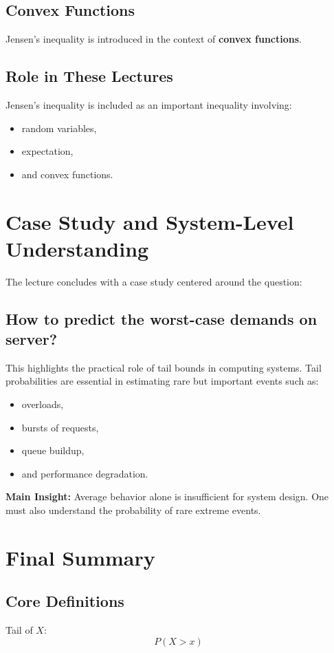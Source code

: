 \documentclass[12pt]{article}
\begin{document}
\subsection{Convex Functions}
Jensen’s inequality is introduced in the context of \textbf{convex functions}.

\subsection{Role in These Lectures}
Jensen’s inequality is included as an important inequality involving:
\begin{itemize}[leftmargin=1.5em]
    \item random variables,
    \item expectation,
    \item and convex functions.
\end{itemize}

\section{Case Study and System-Level Understanding}

The lecture concludes with a case study centered around the question:

\subsection*{How to predict the worst-case demands on server?}

This highlights the practical role of tail bounds in computing systems. Tail probabilities are essential in estimating rare but important events such as:
\begin{itemize}[leftmargin=1.5em]
    \item overloads,
    \item bursts of requests,
    \item queue buildup,
    \item and performance degradation.
\end{itemize}

\textbf{Main Insight:} Average behavior alone is insufficient for system design. One must also understand the probability of rare extreme events.

\section{Final Summary}

\subsection{Core Definitions}
Tail of \(X\):
\[
P(X>x)
\]
\end{document}
